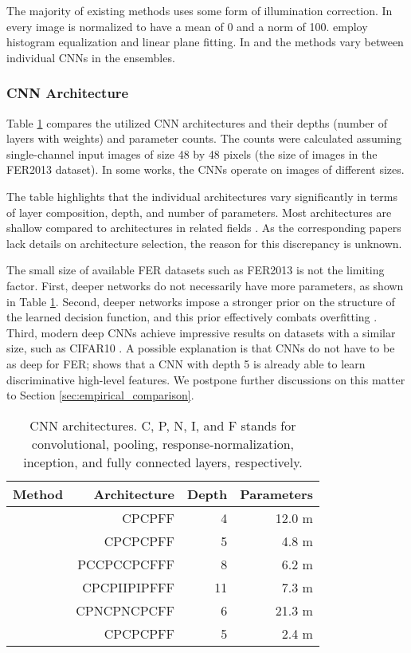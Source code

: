 \documentclass[conference,10pt,a4paper]{IEEEtran}
\begin{document}
The majority of existing methods uses some form of illumination correction. In \cite{tang13} every image is normalized to have a mean of 0 and a norm of 100. \cite{yu15} employ histogram equalization and linear plane fitting. In \cite{kim16} and \cite{kim16cvpr} the methods vary between individual CNNs in the ensembles.

\subsubsection{CNN Architecture} \label{ssub:cnn_architecture}

Table \ref{tbl:sota_cnns} compares the utilized CNN architectures and their depths (number of layers with weights) and parameter counts. The counts were calculated assuming single-channel input images of size 48 by 48 pixels (the size of images in the FER2013 dataset). In some works, the CNNs operate on images of different sizes.

The table highlights that the individual architectures vary significantly in terms of layer composition, depth, and number of parameters. Most architectures are shallow compared to architectures in related fields \cite{parkhi15,szegedy15,he15}. As the corresponding papers lack details on architecture selection, the reason for this discrepancy is unknown.

The small size of available FER datasets such as FER2013 is not the limiting factor. First, deeper networks do not necessarily have more parameters, as shown in Table \ref{tbl:sota_cnns}. Second, deeper networks impose a stronger prior on the structure of the learned decision function, and this prior effectively combats overfitting \cite{goodfellow14}. Third, modern deep CNNs achieve impressive results on datasets with a similar size, such as CIFAR10 \cite{he15}. A possible explanation is that CNNs do not have to be as deep for FER; \cite{khorrami15} shows that a CNN with depth 5 is already able to learn discriminative high-level features. We postpone further discussions on this matter to Section \ref{sec:empirical_comparison}.

\begin{table}[t]
\centering
\caption{CNN architectures. C, P, N, I, and F stands for convolutional, pooling, response-normalization, inception, and fully connected layers, respectively.}
\label{tbl:sota_cnns}
\begin{tabular}{crrr}
    \toprule
    Method & Architecture & Depth & Parameters \\ \midrule
    \cite{tang13} & CPCPFF & 4 & 12.0 m \\ 
    \cite{kim16} & CPCPCPFF & 5 & 4.8 m \\ 
    \cite{yu15} & PCCPCCPCFFF & 8 & 6.2 m  \\ 
    \cite{mollahosseini15} & CPCPIIPIPFFF & 11 & 7.3 m \\
    \cite{zhang2015} & CPNCPNCPCFF & 6 & 21.3 m \\
    \cite{kim16cvpr} & CPCPCPFF & 5 & 2.4 m \\
    \bottomrule
\end{tabular}
\end{table}
\end{document}
